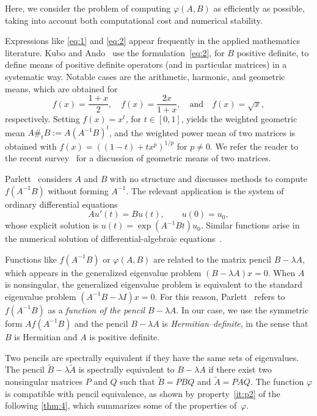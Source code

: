 \documentclass[DIV=14]{scrartcl}
\theoremstyle{thmstyletwo}
\theoremstyle{definition}
\numberwithin{equation}{section}
\newcommand{\deq}{\ensuremath{:=}}
\begin{document}
Here, we consider the problem of computing $\varphi(A,B)$ as efficiently as possible, taking into account both computational cost and numerical stability.

Expressions like \eqref{eq:1} and \eqref{eq:2} appear frequently in the applied mathematics literature. Kubo and Ando~\cite{kuan80} use the formulation~\eqref{eq:2}, for $B$ positive definite, to define means of positive definite operators (and in particular matrices) in a systematic way.
Notable cases are the arithmetic, harmonic, and geometric means, which are obtained for
\[
    f(x)=\frac{1+x}{2},\quad
    f(x)=\frac{2x}{1+x},\quad\text{and}\quad
    f(x)=\sqrt{x},
\]
respectively.
Setting $f(x)=x^t$, for $t\in[0,1]$, yields the weighted geometric mean
$A\#_t B \deq A(A^{-1}B)^t$,
and the weighted power mean of two matrices is obtained with $f(x)=((1-t)+tx^p)^{1/p}$ for $p\ne 0$. We refer the reader to the recent survey~\cite{bi24} for a discussion of geometric means of two matrices.

Parlett~\cite[sect.~2]{parl76} considers $A$ and $B$ with no structure and discusses methods to compute $f(A^{-1}B)$ without forming $A^{-1}$. The relevant application is the system of ordinary differential equations
\[
    Au'(t)=Bu(t),\qquad u(0)=u_0,
\]
whose explicit solution is $u(t) = \exp(A^{-1}Bt)u_0$. Similar functions arise in the numerical solution of differential-algebraic equations~\cite{book}.

Functions like $f(A^{-1}B)$ or $\varphi(A,B)$ are related to the matrix pencil $B-\lambda A$, which appears in the generalized eigenvalue problem $(B-\lambda A)x=0$. When $A$ is nonsingular, the generalized eigenvalue problem is equivalent to the standard eigenvalue problem $(A^{-1}B-\lambda I)x=0$. For this reason, Parlett~\cite{parl76} refers to \(f(A^{-1}B)\) as a \emph{function of the pencil} $B-\lambda A$. In our case, we use the symmetric form $Af(A^{-1}B)$ and the pencil $B-\lambda A$ is {\em Hermitian--definite}, in the sense that $B$ is Hermitian and $A$ is positive definite.

Two pencils are spectrally equivalent if they have the same sets of eigenvalues.
The pencil $\widetilde B-\lambda\widetilde A$ is spectrally equivalent to $B-\lambda A$ if there exist two nonsingular matrices $P$ and $Q$ such that $\widetilde B=PBQ$ and $\widetilde A= PAQ$.
The function $\varphi$ is compatible with pencil equivalence, as shown by property~\ref{it:p2} of the following \cref{thm:4}, which summarizes some of the properties of~$\varphi$.
\end{document}
